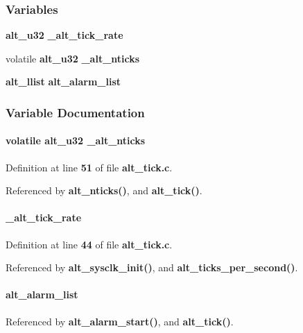 \subsubsection*{Variables}
\begin{DoxyCompactItemize}
\item 
{\bf alt\+\_\+u32} {\bf \+\_\+alt\+\_\+tick\+\_\+rate}
\item 
volatile {\bf alt\+\_\+u32} {\bf \+\_\+alt\+\_\+nticks}
\item 
{\bf alt\+\_\+llist} {\bf alt\+\_\+alarm\+\_\+list}
\end{DoxyCompactItemize}


\subsubsection{Variable Documentation}
\paragraph[{\+\_\+alt\+\_\+nticks}]{\setlength{\rightskip}{0pt plus 5cm}volatile {\bf alt\+\_\+u32} \+\_\+alt\+\_\+nticks}\label{priv_2alt__alarm_8h_a77abfd0b880465ee1511f2d648424428}


Definition at line {\bf 51} of file {\bf alt\+\_\+tick.\+c}.



Referenced by {\bf alt\+\_\+nticks()}, and {\bf alt\+\_\+tick()}.

\paragraph[{\+\_\+alt\+\_\+tick\+\_\+rate}]{ \+\_\+alt\+\_\+tick\+\_\+rate}\label{priv_2alt__alarm_8h_abbfc6eca4ab60b513c03b9aee1e07533}


Definition at line {\bf 44} of file {\bf alt\+\_\+tick.\+c}.



Referenced by {\bf alt\+\_\+sysclk\+\_\+init()}, and {\bf alt\+\_\+ticks\+\_\+per\+\_\+second()}.

\paragraph[{alt\+\_\+alarm\+\_\+list}]{ alt\+\_\+alarm\+\_\+list}\label{priv_2alt__alarm_8h_ab482473a9ab365420e830305284951bd}


Referenced by {\bf alt\+\_\+alarm\+\_\+start()}, and {\bf alt\+\_\+tick()}.

